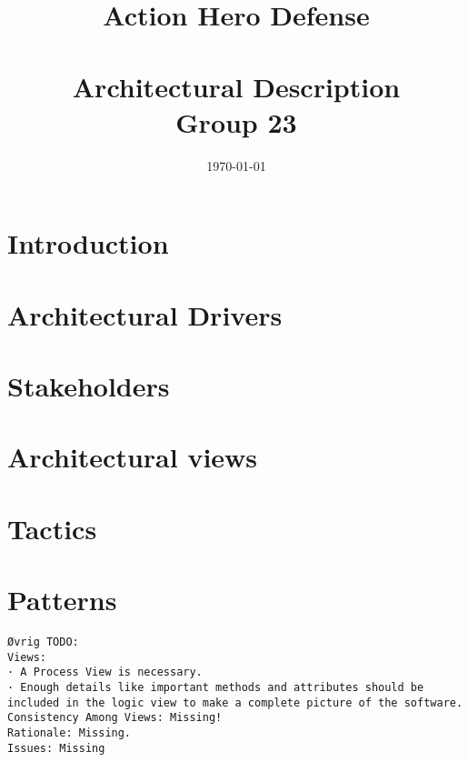 \documentclass[a4paper, 11pt]{article}
\title{\textbf{Action Hero Defense}\\\HRule\\Architectural Description\\ Group 23}
\author{\and Håvard Geithus
	\and  Sondre Løberg Sæter 
	\and Nicolai Meltveit 
	\and Hallvard Andreas Eriksen 
	\and  Håkon Drolsum Røkenes}
\date{\today}
\begin{document}



\tableofcontents
\clearpage

\section{Introduction}


\section{Architectural Drivers}

\section{Stakeholders}

\section{Architectural views}

\section{Tactics}

\section{Patterns}

\begin{verbatim}Øvrig TODO:
Views:
· A Process View is necessary.
· Enough details like important methods and attributes should be included in the logic view to make a complete picture of the software.
Consistency Among Views: Missing!
Rationale: Missing.
Issues: Missing
\end{verbatim}



\end{document}
